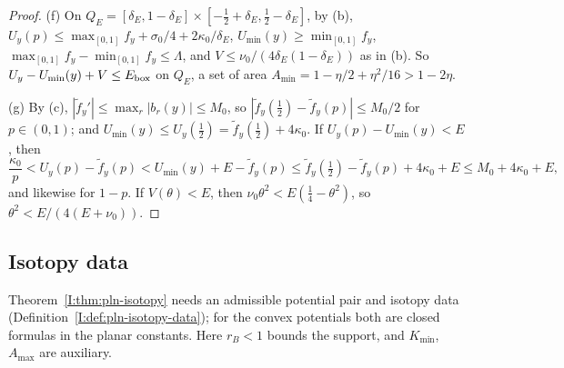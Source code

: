 \begin{proof}
(f) On $Q_E=[\delta_E,1-\delta_E]\times[-\frac12+\delta_E,\frac12-\delta_E]$, by (b), $U_y(p)\le\max_{[0,1]}f_y+\sigma_0/4+2\kappa_0/\delta_E$,
$U_{\min}(y)\ge\min_{[0,1]}f_y$, $\max_{[0,1]}f_y-\min_{[0,1]}f_y\le\Lambda$, and $V\le\nu_0/(4\delta_E(1-\delta_E))$ as in (b). So
$U_y-U_{\min}(y)+V\le E_{\rm box}$ on $Q_E$, a set of area $A_{\min}=1-\eta/2+\eta^2/16>1-2\eta$.

(g) By (c), $|\tilde f_y'|\le\max_r|b_r(y)|\le M_0$, so $|\tilde f_y(\frac12)-\tilde f_y(p)|\le M_0/2$ for $p\in(0,1)$; and
$U_{\min}(y)\le U_y(\frac12)=\tilde f_y(\frac12)+4\kappa_0$. If $U_y(p)-U_{\min}(y)<E$, then
\[
 \frac{\kappa_0}{p}<U_y(p)-\tilde f_y(p)<U_{\min}(y)+E-\tilde f_y(p)\le\tilde f_y(\tfrac12)-\tilde f_y(p)+4\kappa_0+E
 \le M_0+4\kappa_0+E,
\]
and likewise for $1-p$. If $V(\theta)<E$, then $\nu_0\theta^2<E(\frac14-\theta^2)$, so $\theta^2<E/(4(E+\nu_0))$.
\end{proof}


\subsection{Isotopy data}\label{sec:plc-data}

Theorem~\ref{I:thm:pln-isotopy} needs an admissible potential pair and isotopy data
(Definition~\ref{I:def:pln-isotopy-data}); for the convex potentials both are closed formulas in the planar constants.
Here $r_B<1$ bounds the support, and $K_{\min}$, $A_{\max}$ are auxiliary.

